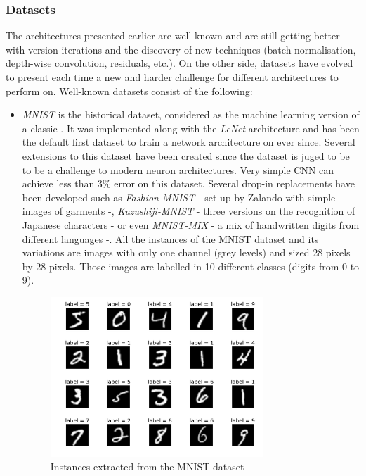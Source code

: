 
\subsubsection{Datasets}

The architectures presented earlier are well-known and are still getting better with version iterations and the discovery of new techniques (batch normalisation, depth-wise convolution, residuals, etc.). On the other side, datasets have evolved to present each time a new and harder challenge for different architectures to perform on. Well-known datasets consist of the following:
\begin{itemize}
  \item \emph{MNIST} is the historical dataset, considered as the machine learning version of a classic . It was implemented along with the \emph{LeNet} architecture and has been the default first dataset to train a network architecture on ever since. Several extensions to this dataset have been created since the dataset is juged to be  to be a challenge to modern neuron architectures. Very simple CNN can achieve less than 3\% error on this dataset. Several drop-in replacements have been developed such as \emph{Fashion-MNIST} \cite{Xiao2017} - set up by Zalando with simple images of garments -, \emph{Kuzushiji-MNIST} \cite{Clanuwat2018} - three versions on the recognition of Japanese characters - or even \emph{MNIST-MIX} \cite{Jiang2020} - a mix of handwritten digits from different languages -. All the instances of the MNIST dataset and its variations are images with only one channel (grey levels) and sized 28 pixels by 28 pixels. Those images are labelled in 10 different classes (digits from 0 to 9).

  \begin{figure}[htbp]
  	\centering
  		\includegraphics[width=8cm]{Figures/MNIST.png}
  	\caption[MNIST]{Instances extracted from the MNIST dataset}
  	\label{fig:MNIST}
  \end{figure}


\end{itemize}
